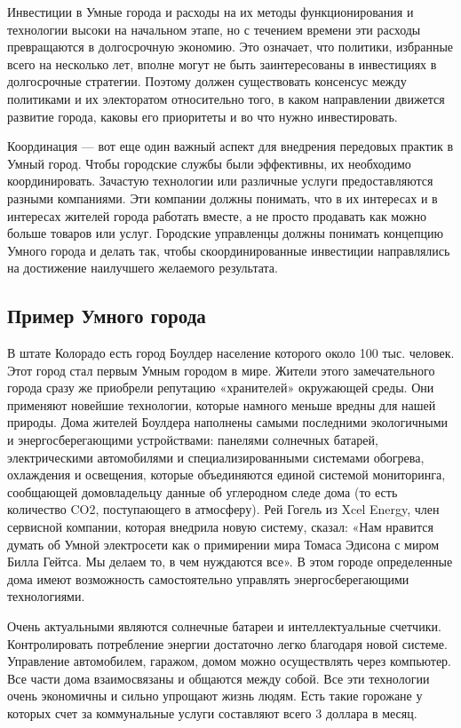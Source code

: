 Инвестиции в Умные города и расходы на их методы функционирования и технологии высоки на начальном этапе, но с течением времени эти расходы превращаются в долгосрочную экономию. Это означает, что политики, избранные всего на несколько лет, вполне могут не быть заинтересованы в инвестициях в долгосрочные стратегии. Поэтому должен существовать консенсус между политиками и их электоратом относительно того, в каком направлении движется развитие города, каковы его приоритеты и во что нужно инвестировать.

Координация — вот еще один важный аспект для внедрения передовых практик в Умный город. Чтобы городские службы были эффективны, их необходимо координировать. Зачастую технологии или различные услуги предоставляются разными компаниями. Эти компании должны понимать, что в их интересах и в интересах жителей города работать вместе, а не просто продавать как можно больше товаров или услуг. Городские управленцы должны понимать концепцию Умного города и делать так, чтобы скоординированные инвестиции направлялись на достижение наилучшего желаемого результата.

\subsection{Пример Умного города}
В штате Колорадо есть город Боулдер население которого около 100 тыс. человек. Этот город стал первым Умным городом в мире. Жители этого замечательного города сразу же приобрели репутацию «хранителей» окружающей среды. Они применяют новейшие технологии, которые намного меньше вредны для нашей природы. Дома жителей Боулдера наполнены самыми последними экологичными и энергосберегающими устройствами: панелями солнечных батарей, электрическими автомобилями и специализированными системами обогрева, охлаждения и освещения, которые объединяются единой системой мониторинга, сообщающей домовладельцу данные об углеродном следе дома (то есть количество CO2, поступающего в атмосферу). Рей Гогель из Xcel Energy, член сервисной компании, которая внедрила новую систему, сказал: «Нам нравится думать об Умной электросети как о примирении мира Томаса Эдисона с миром Билла Гейтса. Мы делаем то, в чем нуждаются все». В этом городе определенные дома имеют возможность самостоятельно управлять энергосберегающими технологиями. 

Очень актуальными являются солнечные батареи и интеллектуальные счетчики. Контролировать потребление энергии достаточно легко благодаря новой системе. Управление автомобилем, гаражом, домом можно осуществлять через компьютер. Все части дома взаимосвязаны и общаются между собой. Все эти технологии очень экономичны и сильно упрощают жизнь людям. Есть такие горожане у которых счет за коммунальные услуги составляют всего 3 доллара в месяц. 

